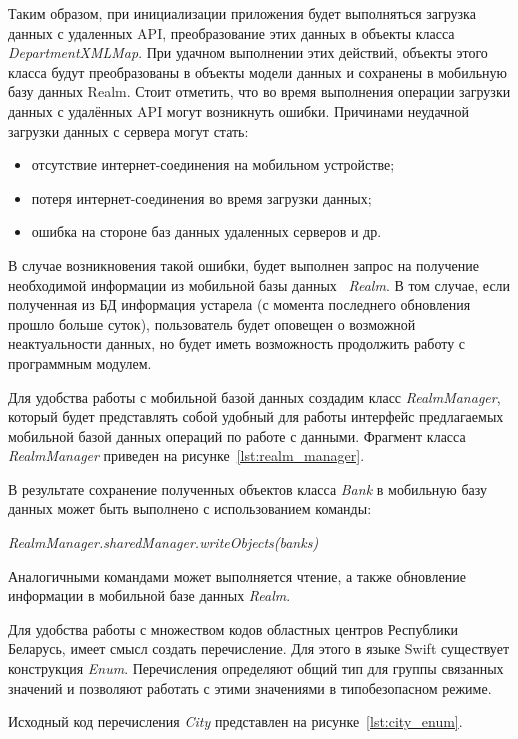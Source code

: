 Таким образом, при инициализации приложения будет выполняться загрузка данных с
удаленных API, преобразование этих данных в объекты класса \textit{DepartmentXMLMap}.
При удачном выполнении этих действий, объекты этого класса будут преобразованы в
объекты модели данных и сохранены в мобильную базу данных Realm. Стоит отметить,
что во время выполнения операции загрузки данных с удалённых API могут возникнуть
ошибки. Причинами неудачной загрузки данных с сервера могут стать:
\begin{itemize}
  \item отсутствие интернет-соединения на мобильном устройстве;
  \item потеря интернет-соединения во время загрузки данных;
  \item ошибка на стороне баз данных удаленных серверов и др.
\end{itemize}

В случае возникновения такой ошибки, будет выполнен запрос на получение
необходимой информации из мобильной базы данных ~\textit{Realm}. В том случае, если
полученная из БД информация устарела (с момента последнего обновления прошло
больше суток), пользователь будет оповещен о возможной неактуальности данных,
но будет иметь возможность продолжить работу с программным модулем.

Для удобства работы с мобильной базой данных создадим класс \textit{RealmManager},
который будет представлять собой удобный для работы интерфейс предлагаемых
мобильной базой данных операций по работе с данными. Фрагмент
класса \textit{RealmManager} приведен на рисунке~\ref{lst:realm_manager}.


В результате сохранение полученных объектов класса \textit{Bank} в мобильную
базу данных может быть выполнено с использованием команды:

\textit{RealmManager.sharedManager.writeObjects(banks)}

Аналогичными командами может выполняется чтение, а также обновление информации
в мобильной базе данных \textit{Realm}.

Для удобства работы с множеством кодов областных центров Республики Беларусь,
имеет смысл создать перечисление. Для этого в языке Swift существует
конструкция \textit{Enum}.
Перечисления определяют общий тип для группы связанных значений и позволяют
работать с этими значениями в типобезопасном режиме.

Исходный код перечисления \textit{City} представлен на рисунке~\ref{lst:city_enum}.


